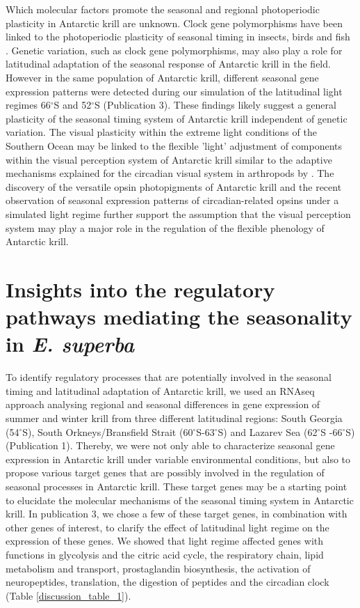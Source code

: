 Which molecular factors promote the seasonal and regional photoperiodic
plasticity in Antarctic krill are unknown. Clock gene polymorphisms have been
linked to the photoperiodic plasticity of seasonal timing in insects, birds and
fish \citep{caprioli_clock_2012, hut_latitudinal_2013, omalley_clock_2010}.
Genetic variation, such as clock gene polymorphisms, may also play a role for
latitudinal adaptation of the seasonal response of Antarctic krill in the
field. However in the same population of Antarctic krill, different seasonal
gene expression patterns were detected during our simulation of the latitudinal
light regimes 66$^{\circ}$S and 52$^{\circ}$S (Publication 3). These findings
likely suggest a general plasticity of the seasonal timing system of Antarctic
krill independent of genetic variation. The visual plasticity within the
extreme light conditions of the Southern Ocean may be linked to the flexible
'light' adjustment of components within the visual perception system of
Antarctic krill similar to the adaptive mechanisms explained for the circadian
visual system in arthropods by \citet{mazzotta_cry_2010}. The discovery of the
versatile opsin photopigments of Antarctic krill \citep{biscontin_opsin_2016}
and the recent observation of seasonal expression patterns of circadian-related
opsins under a simulated light regime \citep{piccolin_seasonal_2018} further
support the assumption that the visual perception system may play a major role
in the regulation of the flexible phenology of Antarctic krill.

\section{Insights into the regulatory pathways mediating the seasonality in \textit{E. superba}}

To identify regulatory processes that are potentially involved in the seasonal
timing and latitudinal adaptation of Antarctic krill, we used an RNAseq
approach analysing regional and seasonal differences in gene expression of
summer and winter krill from three different latitudinal regions: South Georgia
(54$^{\circ}$S), South Orkneys/Bransfield Strait (60$^{\circ}$S-63$^{\circ}$S)
and Lazarev Sea (62$^{\circ}$S -66$^{\circ}$S) (Publication 1). Thereby, we
were not only able to characterize seasonal gene expression in Antarctic krill
under variable environmental conditions, but also to propose various target
genes that are possibly involved in the regulation of seasonal processes in
Antarctic krill. These target genes may be a starting point to elucidate the
molecular mechanisms of the seasonal timing system in Antarctic krill. In
publication 3, we chose a few of these target genes, in combination with other
genes of interest, to clarify the effect of latitudinal light regime on the
expression of these genes. We showed that light regime affected genes with
functions in glycolysis and the citric acid cycle, the respiratory chain, lipid
metabolism and transport, prostaglandin biosynthesis, the activation of
neuropeptides, translation, the digestion of peptides and the circadian clock
(Table \ref{discussion_table_1}).


